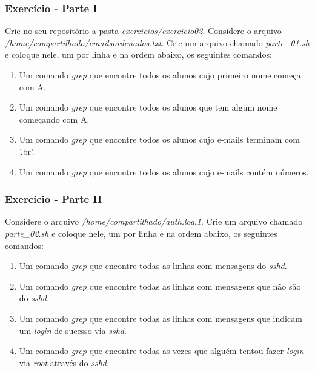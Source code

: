 \documentclass{beamer}
\begin{document}
   \begin{frame}
      \frametitle{Exercício - Parte I}
      Crie no seu repositório a pasta \textit{exercicios/exercicio02}. Considere o arquivo \textit{/home/compartilhado/emailsordenados.txt}. Crie um arquivo chamado \textit{parte\_01.sh} e coloque nele, 
      um por linha e na ordem abaixo, os seguintes comandos:
      \begin{enumerate}
         \item Um comando \textit{grep} que encontre todos os alunos cujo primeiro nome começa com A.
	      \item Um comando \textit{grep} que encontre todos os alunos que tem algum nome começando com A.
	      \item Um comando \textit{grep} que encontre todos os alunos cujo e-mails terminam com '.br'.
	      \item Um comando \textit{grep} que encontre todos os alunos cujo e-mails contém números.
      \end{enumerate}
   \end{frame}

   \begin{frame}
      \frametitle{Exercício - Parte II}
      Considere o arquivo \textit{/home/compartilhado/auth.log.1}. Crie um arquivo chamado \textit{parte\_02.sh} e coloque nele, 
      um por linha e na ordem abaixo, os seguintes comandos:
      \begin{enumerate}
         \item Um comando \textit{grep} que encontre todas as linhas com mensagens do \textit{sshd}.
	      \item Um comando \textit{grep} que encontre todas as linhas com mensagens que não são do \textit{sshd}.
	      \item Um comando \textit{grep} que encontre todas as linhas com mensagens que indicam um \textit{login} de sucesso via \textit{sshd}.
	      \item Um comando \textit{grep} que encontre todas as vezes que alguém tentou fazer \textit{login} via \textit{root} através do \textit{sshd}.
      \end{enumerate}
   \end{frame}
\end{document}
